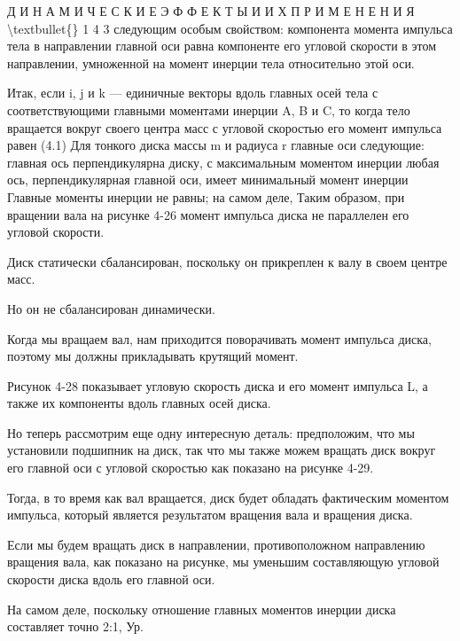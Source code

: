 \documentclass[10pt,oneside]{article}
\begin{document}
Д И Н А М И Ч Е С К И Е  Э Ф Ф Е К Т Ы  И  И Х  П Р И М Е Н Е Н И Я \textbackslash{}textbullet\{\} 1 4 3 следующим особым свойством: компонента момента импульса тела в направлении главной оси равна компоненте его угловой скорости в этом направлении, умноженной на момент инерции тела относительно этой оси.\par

Итак, если i, j и k --- единичные векторы вдоль главных осей тела с соответствующими главными моментами инерции A, B и C, то когда тело вращается вокруг своего центра масс с угловой скоростью его момент импульса равен (4.1) Для тонкого диска массы m и радиуса r главные оси следующие: главная ось перпендикулярна диску, с максимальным моментом инерции любая ось, перпендикулярная главной оси, имеет минимальный момент инерции Главные моменты инерции не равны; на самом деле, Таким образом, при вращении вала на рисунке 4-26 момент импульса диска не параллелен его угловой скорости.\par

Диск статически сбалансирован, поскольку он прикреплен к валу в своем центре масс.\par

Но он не сбалансирован динамически.\par

Когда мы вращаем вал, нам приходится поворачивать момент импульса диска, поэтому мы должны прикладывать крутящий момент.\par

Рисунок 4-28 показывает угловую скорость диска и его момент импульса L, а также их компоненты вдоль главных осей диска.\par

Но теперь рассмотрим еще одну интересную деталь: предположим, что мы установили подшипник на диск, так что мы также можем вращать диск вокруг его главной оси с угловой скоростью как показано на рисунке 4-29.\par

Тогда, в то время как вал вращается, диск будет обладать фактическим моментом импульса, который является результатом вращения вала и вращения диска.\par

Если мы будем вращать диск в направлении, противоположном направлению вращения вала, как показано на рисунке, мы уменьшим составляющую угловой скорости диска вдоль его главной оси.\par

На самом деле, поскольку отношение главных моментов инерции диска составляет точно 2:1, Ур.\par
\end{document}
